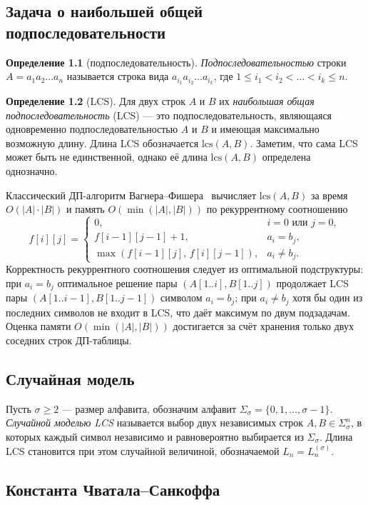 \subsection{Задача о наибольшей общей подпоследовательности}

\textbf{Определение 1.1} (подпоследовательность).
\emph{Подпоследовательностью} строки $A = a_1 a_2 \ldots a_n$ называется строка вида $a_{i_1} a_{i_2} \ldots a_{i_k}$, где $1 \leq i_1 < i_2 < \ldots < i_k \leq n$.

\textbf{Определение 1.2} (LCS).
Для двух строк $A$ и $B$ их \emph{наибольшая общая подпоследовательность} (LCS) --- это подпоследовательность, являющаяся одновременно подпоследовательностью $A$ и $B$ и имеющая максимально возможную длину. Длина LCS обозначается $\mathrm{lcs}(A, B)$. Заметим, что сама LCS может быть не единственной, однако её длина $\mathrm{lcs}(A, B)$ определена однозначно.

Классический ДП-алгоритм Вагнера--Фишера~\cite{wagner1974} вычисляет $\mathrm{lcs}(A, B)$ за время $O(|A| \cdot |B|)$ и память $O(\min(|A|, |B|))$ по рекуррентному соотношению
\[
    f[i][j] =
    \begin{cases}
        0, & i = 0 \text{ или } j = 0,\\
        f[i-1][j-1] + 1, & a_i = b_j,\\
        \max(f[i-1][j],\, f[i][j-1]), & a_i \neq b_j.
    \end{cases}
\]
Корректность рекуррентного соотношения следует из оптимальной подструктуры: при $a_i = b_j$ оптимальное решение пары $(A[1..i], B[1..j])$ продолжает LCS пары $(A[1..i-1], B[1..j-1])$ символом $a_i = b_j$; при $a_i \neq b_j$ хотя бы один из последних символов не входит в LCS, что даёт максимум по двум подзадачам. Оценка памяти $O(\min(|A|, |B|))$ достигается за счёт хранения только двух соседних строк ДП-таблицы.

\subsection{Случайная модель}

Пусть $\sigma \geq 2$ --- размер алфавита, обозначим алфавит $\Sigma_\sigma = \{0, 1, \ldots, \sigma-1\}$. \emph{Случайной моделью LCS} называется выбор двух независимых строк $A, B \in \Sigma_\sigma^n$, в которых каждый символ независимо и равновероятно выбирается из $\Sigma_\sigma$. Длина LCS становится при этом случайной величиной, обозначаемой $L_n = L_n^{(\sigma)}$.

\subsection{Константа Чватала--Санкоффа}

